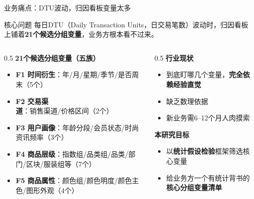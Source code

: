 \documentclass{beamer}
\begin{document}
\begin{frame}{业务痛点：DTU波动，归因看板变量太多}
    \begin{block}{核心问题}
        每日DTU（Daily Transaction Units，日交易笔数）波动时，归因看板上铺着\textbf{21个候选分组变量}，业务方根本看不过来。
    \end{block}
    
    \begin{columns}[T]
        \begin{column}{0.5\textwidth}
            \textbf{21个候选分组变量（五族）}
            \begin{itemize}
                \item \textbf{F1 时间衍生}：年/月/星期/季节/是否周末（5个）
                \item \textbf{F2 交易渠道}：销售渠道/价格区间（2个）
                \item \textbf{F3 用户画像}：年龄分段/会员状态/时尚资讯频率（3个）
                \item \textbf{F4 商品层级}：指数组/品类组/品类/部门/区块/服装组等（7个）
                \item \textbf{F5 商品属性}：颜色组/颜色明度/颜色主色/图形外观（4个）
            \end{itemize}
        \end{column}
        \begin{column}{0.5\textwidth}
            \textbf{行业现状}
            \begin{itemize}
                \item 到底盯哪几个变量，\textbf{完全依赖经验直觉}
                \item 缺乏数理依据
                \item 新业务需6--12个月人肉摸索
            \end{itemize}
            \vspace{0.5cm}
            \textbf{本研究目标}
            \begin{itemize}
                \item 以\textbf{统计假设检验}框架筛选核心变量
                \item 给业务方一个有统计背书的\textbf{核心分组变量清单}
            \end{itemize}
        \end{column}
    \end{columns}
\end{frame}
\end{document}
